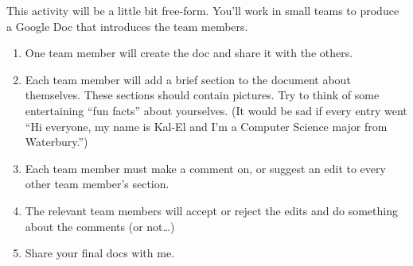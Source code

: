 This activity will be a little bit free-form.  You'll work in small teams to produce a Google Doc that introduces the team members.

\begin{enumerate}
\item One team member will create the doc and share it with the others.
\item Each team member will add a brief section to the document about themselves.  These sections should contain pictures.  Try to think of some entertaining ``fun facts'' about yourselves.  (It would be sad if every entry went ``Hi everyone, my name is Kal-El and I'm a Computer Science major from Waterbury.'')
\item Each team member must make a comment on, or suggest an edit to every other team member's section.
\item The relevant team members will accept or reject the edits and do something about the comments (or not\dots)
\item Share your final docs with me.
\end{enumerate}